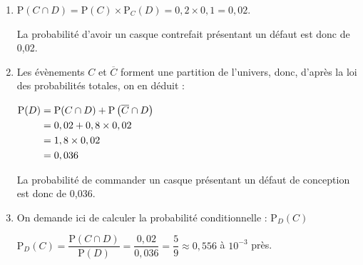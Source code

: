 \begin{enumerate}
\item 	$\mathrm{P}(C\cap D) = \mathrm{P}(C) \times \mathrm{P}_C(D) = 0,2 \times 0,1 = 0,02$.

La probabilité d'avoir un casque contrefait présentant un défaut est donc de 0,02.

\item Les évènements $C$ et $\overline{C}$ forment une partition de l'univers, donc, d'après la loi des probabilités totales, on en déduit :

$\aligned[t] \mathrm{P}(D) &= \mathrm{P}(C \cap D) + \mathrm{P}\left(\overline{C} \cap D\right)\\
&= 0,02 + 0,8 \times 0,02\\
&= 1,8 \times 0,02\\
&= 0,036\endaligned$

La probabilité de commander un casque présentant un défaut de conception est donc de 0,036.
\item On demande ici de calculer la probabilité conditionnelle : $\mathrm{P}_D(C)$

$\mathrm{P}_D(C) = \dfrac{\mathrm{P}(C \cap D)}{\mathrm{P}(D)} = \dfrac{0,02}{0,036} = \dfrac{5}{9} \approx 0,556$ à $10^{-3}$ près.
\end{enumerate}

\medskip

